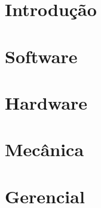 

\newpage
\chapter{Introdução}



\newpage
\chapter{Software}



\newpage
\chapter{Hardware}



\newpage
\chapter{Mec\^anica}



\newpage
\chapter{Gerencial}


